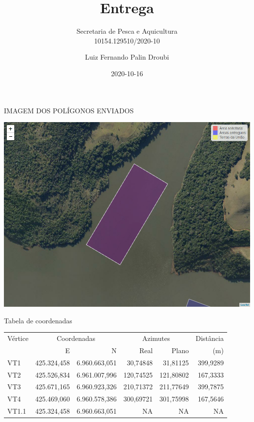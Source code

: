 \documentclass[ignorenonframetext,]{beamer}
\title[]{Entrega}
\subtitle{Secretaria de Pesca e Aquicultura\\
10154.129510/2020-10}
\author[
        Luiz Fernando Palin Droubi
    ]{Luiz Fernando Palin Droubi}
\institute[
    ]{
    Superintendência do Patrimônio da União em Santa Catarina - SPU/SC
    }
\date[
      2020-10-16
  ]{
      2020-10-16
        }
\begin{document}
  \begin{frame}[plain]
  \titlepage
  \end{frame}



\begin{frame}{IMAGEM DOS POLÍGONOS ENVIADOS}
\protect\hypertarget{imagem-dos-poluxedgonos-enviados}{}

\begin{center}\includegraphics[width=1\linewidth]{imagem_10154-129510-2020-10} \end{center}

\end{frame}

\begin{frame}{Tabela de coordenadas}
\protect\hypertarget{tabela-de-coordenadas}{}

\begin{table}[H]
\centering\begingroup\fontsize{6}{8}\selectfont

\begin{tabular}{lrrrrr}
\toprule
\multicolumn{1}{c}{Vértice} & \multicolumn{2}{c}{Coordenadas} & \multicolumn{2}{c}{Azimutes} & \multicolumn{1}{c}{Distância} \\
\cmidrule(l{3pt}r{3pt}){1-1} \cmidrule(l{3pt}r{3pt}){2-3} \cmidrule(l{3pt}r{3pt}){4-5} \cmidrule(l{3pt}r{3pt}){6-6}
  & E & N & Real & Plano & (m)\\
\midrule
VT1 & 425.324,458 & 6.960.663,051 & 30,74848 & 31,81125 & 399,9289\\
VT2 & 425.526,834 & 6.961.007,996 & 120,74525 & 121,80802 & 167,3333\\
VT3 & 425.671,165 & 6.960.923,326 & 210,71372 & 211,77649 & 399,7875\\
VT4 & 425.469,060 & 6.960.578,386 & 300,69721 & 301,75998 & 167,5646\\
VT1.1 & 425.324,458 & 6.960.663,051 & NA & NA & NA\\
\bottomrule
\end{tabular}
\endgroup{}
\end{table}

\end{frame}
\end{document}
